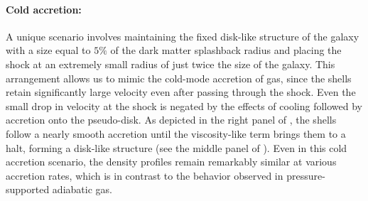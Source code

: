\paragraph{Cold accretion:}
A unique scenario involves maintaining the fixed disk-like structure of the galaxy with a size equal to $5\%$ of the dark matter splashback radius and placing the shock at an extremely small radius of just twice the size of the galaxy. This arrangement allows us to mimic the cold-mode accretion of gas, since the shells retain significantly large velocity even after passing through the shock. Even the small drop in velocity at the shock is negated by the effects of cooling followed by accretion onto the pseudo-disk. As depicted in the right panel of , the shells follow a nearly smooth accretion until the viscosity-like term brings them to a halt, forming a disk-like structure (see the middle panel of ). Even in this cold accretion scenario, the density profiles remain remarkably similar at various accretion rates, which is in contrast to the behavior observed in pressure-supported adiabatic gas. 

